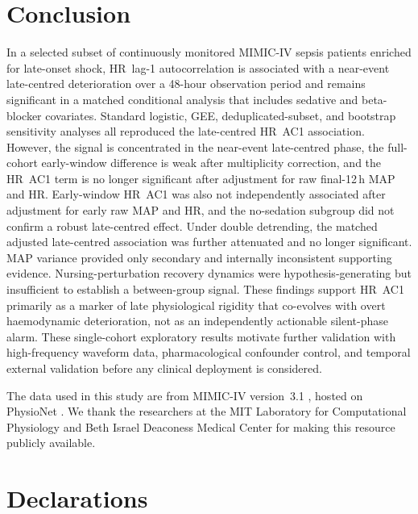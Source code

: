 \documentclass[referee,lineno,pdflatex]{sn-article-template/sn-jnl}
\begin{document}
\section{Conclusion}
\label{sec:conclusion}

In a selected subset of continuously monitored MIMIC-IV sepsis patients enriched for
late-onset shock, HR~lag-1 autocorrelation is associated with a near-event late-centred
deterioration over a 48-hour observation period and remains significant in a matched conditional analysis
that includes sedative and beta-blocker covariates.
Standard logistic, GEE, deduplicated-subset, and bootstrap sensitivity analyses all
reproduced the late-centred HR~AC1 association.
However, the signal is concentrated in the near-event late-centred phase, the full-cohort
early-window difference is weak after multiplicity correction, and the HR~AC1 term is no
longer significant after adjustment for raw final-12\,h MAP and HR.
Early-window HR~AC1 was also not independently associated after adjustment for early raw
MAP and HR, and the no-sedation subgroup did not confirm a robust late-centred effect.
Under double detrending, the matched adjusted late-centred association was further
attenuated and no longer significant.
MAP variance provided only secondary and internally inconsistent supporting evidence.
Nursing-perturbation recovery dynamics were hypothesis-generating but insufficient
to establish a between-group signal.
These findings support HR~AC1 primarily as a marker of late physiological rigidity that
co-evolves with overt haemodynamic deterioration, not as an independently actionable
silent-phase alarm.
These single-cohort exploratory results motivate further validation with
high-frequency waveform data, pharmacological confounder control,
and temporal external validation before any clinical deployment is considered.

\backmatter

The data used in this study are from MIMIC-IV version~3.1 \cite{johnson2024mimiciv},
hosted on PhysioNet \cite{goldberger2000}.
We thank the researchers at the MIT Laboratory for Computational Physiology and
Beth Israel Deaconess Medical Center for making this resource publicly available.

\section*{Declarations}
\end{document}
